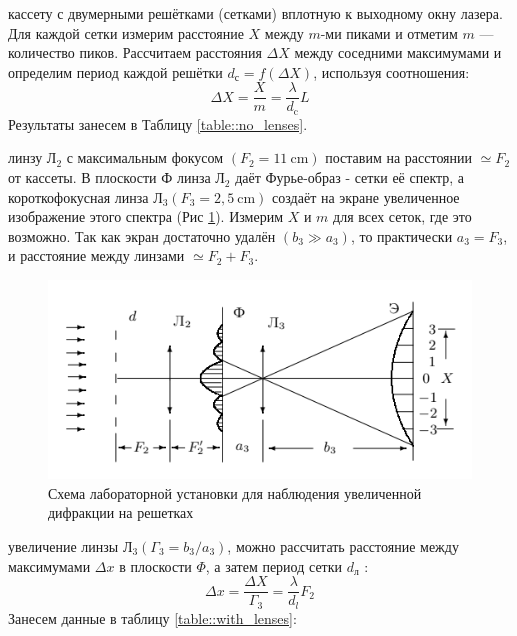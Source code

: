 \documentclass[a4paper, 12pt]{article}
\begin{document}
\begin{enumerate}
     кассету с двумерными решётками (сетками) вплотную к выходному окну лазера. Для каждой сетки измерим расстояние $X$ между $m$-ми пиками и отметим $m$ — количество пиков. Рассчитаем расстояния $\Delta X$ между соседними максимумами и определим период каждой решётки $d_с = f(\Delta X)$, используя соотношения:
        \begin{equation*}
            \Delta X=\frac{X}{m}=\frac{\lambda}{d_{\mathrm{c}}} L
        \end{equation*}
        Результаты занесем в Таблицу \ref{table::no_lenses}.
    
         линзу Л$_{2}$ с максимальным фокусом $\left(F_{2} = 11 \mathrm{~cm}\right)$ поставим на расстоянии $\simeq F_{2}$ от кассеты. В плоскости Ф линза Л$_{2}$ даёт Фурье-образ - сетки её спектр, а короткофокусная линза Л$_{3}\left(F_{3} = 2,5 \mathrm{~cm}\right)$ создаёт на экране увеличенное изображение этого спектра (Рис \ref{fig:scheme_III}).
        Измерим $X$ и $m$ для всех сеток, где это возможно. Так как экран достаточно удалён $\left(b_{3} \gg a_{3}\right)$, то практически $a_{3}=F_{3}$, и расстояние между линзами $\simeq F_{2}+F_{3} .$
        
        \begin{figure}[h]
            \centering
            \includegraphics[width=15cm]{scheme_III.png}
            \caption{Схема лабораторной установки для наблюдения увеличенной дифракции на решетках}
            \label{fig:scheme_III}
        \end{figure}

         увеличение линзы ${Л_{3}}\left(\Gamma_{3}=b_{3} / a_{3}\right)$, можно рассчитать расстояние между максимумами $\Delta x$ в плоскости $\Phi$, а затем период сетки $d_{л}$ :
        $$
        \Delta x=\frac{\Delta X}{\Gamma_{3}}=\frac{\lambda}{d_{l}} F_{2}
        $$
        Занесем данные в таблицу \ref{table::with_lenses}:
\end{enumerate}
\end{document}
